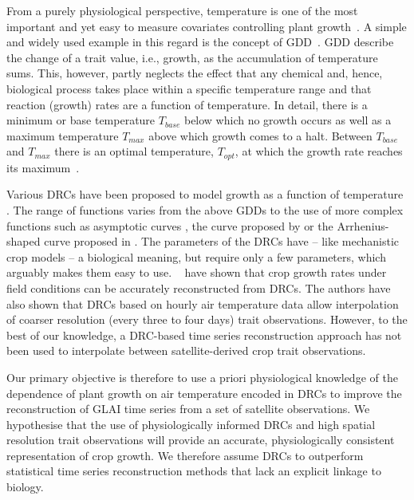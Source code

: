 From a purely physiological perspective, temperature is one of the most important and yet easy to measure covariates controlling plant growth~\citep{porter_temperatures_1999, asseng_climate_2019}. A simple and widely used example in this regard is the concept of \gls{GDD}~\citep{mcmaster_growing_1997}. \gls{GDD} describe the change of a trait value, i.e., growth, as the accumulation of temperature sums. This, however, partly neglects the effect that any chemical and, hence, biological process takes place within a specific temperature range and that reaction (growth) rates are a function of temperature. In detail, there is a minimum or base temperature $T_{base}$ below which no growth occurs as well as a maximum temperature $T_{max}$ above which growth comes to a halt. Between $T_{base}$ and $T_{max}$ there is an optimal temperature, $T_{opt}$, at which the growth rate reaches its maximum~\citep{porter_temperatures_1999}.

Various \gls{DRC}s have been proposed to model growth as a function of temperature \citep{wang_uncertainty_2017}. The range of functions varies from the above \gls{GDD}s to the use of more complex functions such as asymptotic curves \citep{roth_phenomics_2022}, the curve proposed by \cite{wang_simulation_1998} or the Arrhenius-shaped curve proposed in \cite{parent_temperature_2012}. The parameters of the \gls{DRC}s have -- like mechanistic crop models -- a biological meaning, but require only a few parameters, which arguably makes them easy to use. ~\citet{roth_phenomics_2022} have shown that crop growth rates under field conditions can be accurately reconstructed from \gls{DRC}s. The authors have also shown that \gls{DRC}s based on hourly air temperature data allow interpolation of coarser resolution (every three to four days) trait observations. However, to the best of our knowledge, a \gls{DRC}-based time series reconstruction approach has not been used to interpolate between satellite-derived crop trait observations.

Our primary objective is therefore to use a priori physiological knowledge of the dependence of plant growth on air temperature encoded in \gls{DRC}s to improve the reconstruction of \gls{GLAI} time series from a set of satellite observations. We hypothesise that the use of physiologically informed \gls{DRC}s and high spatial resolution trait observations will provide an accurate, physiologically consistent representation of crop growth. We therefore assume \gls{DRC}s to outperform statistical time series reconstruction methods that lack an explicit linkage to biology.

